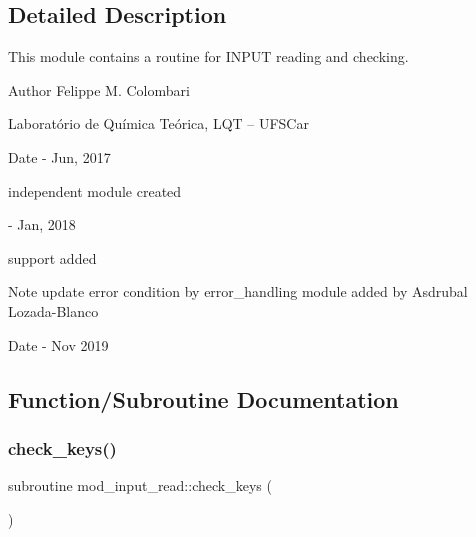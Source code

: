 \subsection{Detailed Description}
This module contains a routine for I\+N\+P\+UT reading and checking. 

\begin{DoxyAuthor}{Author}
Felippe M. Colombari
\begin{DoxyItemize}
\item Laboratório de Química Teórica, L\+QT -- U\+F\+S\+Car 
\end{DoxyItemize}
\end{DoxyAuthor}
\begin{DoxyDate}{Date}
-\/ Jun, 2017
\begin{DoxyItemize}
\item independent module created 
\end{DoxyItemize}

-\/ Jan, 2018
\begin{DoxyItemize}
\item support added 
\end{DoxyItemize}
\end{DoxyDate}
\begin{DoxyNote}{Note}
update error condition by error\+\_\+handling module added by Asdrubal Lozada-\/\+Blanco 
\end{DoxyNote}
\begin{DoxyDate}{Date}
-\/ Nov 2019 
\end{DoxyDate}


\subsection{Function/\+Subroutine Documentation}
\mbox{\label{namespacemod__input__read_a396026faa10ab3698196930dfb90690b}} 
\subsubsection{\texorpdfstring{check\+\_\+keys()}{check\_keys()}}
{\footnotesize\ttfamily subroutine mod\+\_\+input\+\_\+read\+::check\+\_\+keys (\begin{DoxyParamCaption}{ }\end{DoxyParamCaption})}



